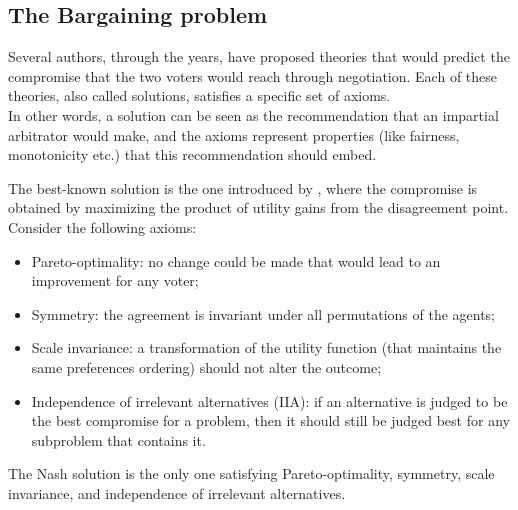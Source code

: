 \documentclass[version=3.21, pagesize, twoside=off, bibliography=totoc, DIV=calc, fontsize=12pt, a4paper]{scrartcl}
\begin{document}
\subsection{The Bargaining problem}
Several authors, through the years, have proposed theories that would predict the compromise that the two voters would reach through negotiation. 
Each of these theories, also called solutions, satisfies a specific set of axioms.
\\ 
In other words, a solution can be seen as the recommendation that an impartial arbitrator would make, and the axioms represent properties (like fairness, monotonicity etc.) that this recommendation should embed. 

The best-known solution is the one introduced by \cite{Nash1950}, where the compromise is obtained by maximizing the product of utility gains from the disagreement point.
Consider the following axioms:
\begin{itemize}
	\item Pareto-optimality: no change could be made that would lead to an improvement for any voter;
	\item Symmetry: the agreement is invariant under all permutations of the agents;
	\item Scale invariance: a transformation of the utility function (that maintains the same preferences ordering) should not alter the outcome;
	\item Independence of irrelevant alternatives (IIA): if an alternative is judged to be the best compromise for a problem, then it should still be judged best for any subproblem that contains it.
\end{itemize}

The Nash solution is the only one satisfying Pareto-optimality, symmetry, scale invariance, and independence of irrelevant alternatives.
\end{document}

